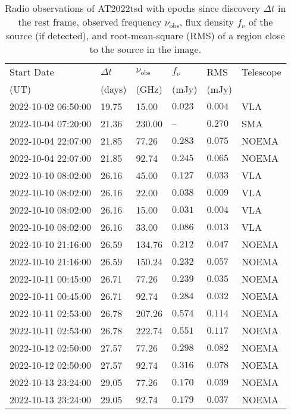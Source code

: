 \documentclass{nature_plusfigure}
\begin{document}
\begin{supplement}
\begin{center} 
\begin{longtable}{llllll} 
\caption{Radio observations of AT2022tsd with epochs since discovery $\Delta t$ in the rest frame, observed frequency $\nu_\mathrm{obs}$, flux density $f_\nu$ of the source (if detected), and root-mean-square (RMS) of a region close to the source in the image.} 
\label{tab:radio-observations}\\ 
\hline\hline
Start Date & $\Delta t$ & $\nu_\mathrm{obs}$ & $f_\nu$ & RMS & Telescope\\ 
(UT) & (days) & (GHz) & (mJy) & (mJy) & \\ 
\hline
2022-10-02 06:50:00 & 19.75 & 15.00 & $0.023$ & $0.004$ & VLA \\ 
2022-10-04 07:20:00 & 21.36 & 230.00 & -- & $0.270$ & SMA \\ 
2022-10-04 22:07:00 & 21.85 & 77.26 & $0.283$ & $0.075$ & NOEMA \\ 
2022-10-04 22:07:00 & 21.85 & 92.74 & $0.245$ & $0.065$ & NOEMA \\ 
2022-10-10 08:02:00 & 26.16 & 45.00 & $0.127$ & $0.033$ & VLA \\ 
2022-10-10 08:02:00 & 26.16 & 22.00 & $0.038$ & $0.009$ & VLA \\ 
2022-10-10 08:02:00 & 26.16 & 15.00 & $0.031$ & $0.004$ & VLA \\ 
2022-10-10 08:02:00 & 26.16 & 33.00 & $0.086$ & $0.013$ & VLA \\ 
2022-10-10 21:16:00 & 26.59 & 134.76 & $0.212$ & $0.047$ & NOEMA \\ 
2022-10-10 21:16:00 & 26.59 & 150.24 & $0.232$ & $0.057$ & NOEMA \\ 
2022-10-11 00:45:00 & 26.71 & 77.26 & $0.239$ & $0.035$ & NOEMA \\ 
2022-10-11 00:45:00 & 26.71 & 92.74 & $0.284$ & $0.032$ & NOEMA \\ 
2022-10-11 02:53:00 & 26.78 & 207.26 & $0.574$ & $0.114$ & NOEMA \\ 
2022-10-11 02:53:00 & 26.78 & 222.74 & $0.551$ & $0.117$ & NOEMA \\ 
2022-10-12 02:50:00 & 27.57 & 77.26 & $0.298$ & $0.082$ & NOEMA \\ 
2022-10-12 02:50:00 & 27.57 & 92.74 & $0.316$ & $0.078$ & NOEMA \\ 
2022-10-13 23:24:00 & 29.05 & 77.26 & $0.170$ & $0.039$ & NOEMA \\ 
2022-10-13 23:24:00 & 29.05 & 92.74 & $0.179$ & $0.037$ & NOEMA \\ 

\end{longtable}
\end{center}
\end{supplement}
\end{document}
